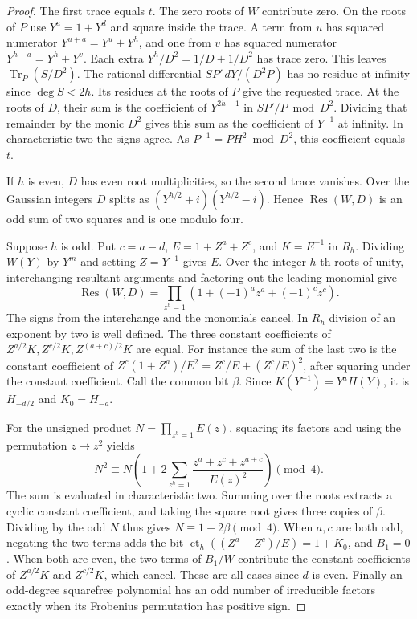 \documentclass[11pt]{article}
\begin{document}
\begin{proof}
The first trace equals \(t\). The zero roots of \(W\) contribute
zero. On the roots of \(P\) use \(Y^a=1+Y^d\) and square inside
the trace. A term from \(u\) has squared numerator
\(Y^{u+a}=Y^u+Y^h\), and one from \(v\) has squared numerator
\(Y^{h+a}=Y^h+Y^v\). Each extra \(Y^h/D^2=1/D+1/D^2\) has
trace zero. This leaves \(\operatorname{Tr}_P(S/D^2)\).
The rational differential \(SP'\,dY/(D^2P)\) has no residue at
infinity since \(\deg S<2h\). Its residues at the roots of \(P\)
give the requested trace. At the roots of \(D\), their sum is the
coefficient of \(Y^{2h-1}\) in \(SP'/P\bmod D^2\). Dividing that
remainder by the monic \(D^2\) gives this sum as the coefficient of
\(Y^{-1}\) at infinity. In characteristic two the signs agree.
As \(P^{-1}=PH^2\bmod D^2\), this coefficient equals \(t\).

If \(h\) is even, \(D\) has even root multiplicities, so the second
trace vanishes. Over the Gaussian integers \(D\) splits as
\((Y^{h/2}+i)(Y^{h/2}-i)\). Hence \(\operatorname{Res}(W,D)\) is
an odd sum of two squares and is one modulo four.

Suppose \(h\) is odd. Put \(c=a-d\), \(E=1+Z^a+Z^c\), and
\(K=E^{-1}\) in \(R_h\). Dividing \(W(Y)\) by \(Y^m\) and setting
\(Z=Y^{-1}\) gives \(E\). Over the integer \(h\)-th roots of unity,
interchanging resultant arguments and factoring out the leading
monomial give
\[
 \operatorname{Res}(W,D)=\prod_{z^h=1}
      (1+(-1)^a z^a+(-1)^c z^c).
\]
The signs from the interchange and the monomials cancel.
In \(R_h\) division of an exponent by two is well defined. The three
constant coefficients of \(Z^{a/2}K, Z^{c/2}K, Z^{(a+c)/2}K\)
are equal. For instance the sum of the last two is the constant
coefficient of \(Z^c(1+Z^a)/E^2=Z^c/E+(Z^c/E)^2\),
after squaring under the constant coefficient. Call the common bit
\(\beta\). Since \(K(Y^{-1})=Y^a H(Y)\), it is \(H_{-d/2}\)
and \(K_0=H_{-a}\).

For the unsigned product \(N=\prod_{z^h=1} E(z)\), squaring its
factors and using the permutation \(z\mapsto z^2\) yields
\[
 N^2\equiv N\left(1+2\sum_{z^h=1}
       \frac{z^a+z^c+z^{a+c}}{E(z)^2}\right)\pmod4.
\]
The sum is evaluated in characteristic two. Summing over the roots
extracts a cyclic constant coefficient, and taking the square root
gives three copies of \(\beta\). Dividing by the odd \(N\) thus gives
\(N\equiv1+2\beta\pmod4\). When \(a,c\) are both odd, negating
the two terms adds the bit \(\operatorname{ct}_h((Z^a+Z^c)/E)
=1+K_0\), and \(B_1=0\). When both are even, the two terms of
\(B_1/W\) contribute the constant coefficients of \(Z^{a/2}K\)
and \(Z^{c/2}K\), which cancel. These are all cases since \(d\)
is even. Finally an odd-degree squarefree polynomial has an odd
number of irreducible factors exactly when its Frobenius permutation
has positive sign.
\end{proof}
\end{document}
